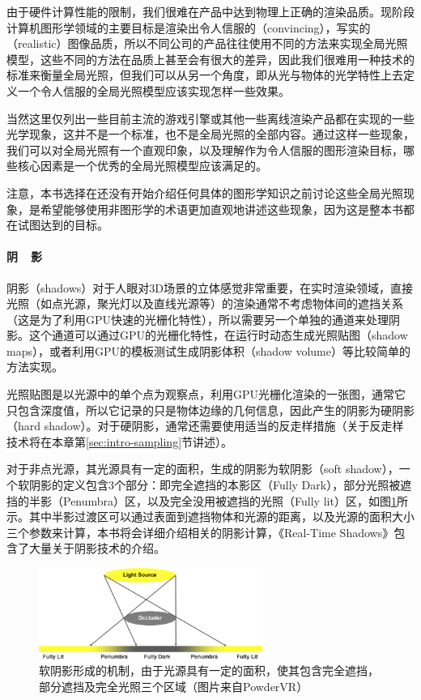 由于硬件计算性能的限制，我们很难在产品中达到物理上正确的渲染品质。现阶段计算机图形学领域的主要目标是渲染出令人信服的（convincing），写实的（realistic）图像品质，所以不同公司的产品往往使用不同的方法来实现全局光照模型，这些不同的方法在品质上甚至会有很大的差异，因此我们很难用一种技术的标准来衡量全局光照，但我们可以从另一个角度，即从光与物体的光学特性上去定义一个令人信服的全局光照模型应该实现怎样一些效果。

当然这里仅列出一些目前主流的游戏引擎或其他一些离线渲染产品都在实现的一些光学现象，这并不是一个标准，也不是全局光照的全部内容。通过这样一些现象，我们可以对全局光照有一个直观印象，以及理解作为令人信服的图形渲染目标，哪些核心因素是一个优秀的全局光照模型应该满足的。

注意，本书选择在还没有开始介绍任何具体的图形学知识之前讨论这些全局光照现象，是希望能够使用非图形学的术语更加直观地讲述这些现象，因为这是整本书都在试图达到的目标。



\paragraph{阴~~影}
阴影（shadows）对于人眼对3D场景的立体感觉非常重要，在实时渲染领域，直接光照（如点光源，聚光灯以及直线光源等）的渲染通常不考虑物体间的遮挡关系（这是为了利用GPU快速的光栅化特性），所以需要另一个单独的通道来处理阴影。这个通道可以通过GPU的光栅化特性，在运行时动态生成光照贴图（shadow maps），或者利用GPU的模板测试生成阴影体积（shadow volume）等比较简单的方法实现。

光照贴图是以光源中的单个点为观察点，利用GPU光栅化渲染的一张图，通常它只包含深度值，所以它记录的只是物体边缘的几何信息，因此产生的阴影为硬阴影（hard shadow）。对于硬阴影，通常还需要使用适当的反走样措施（关于反走样技术将在本章第\ref{sec:intro-sampling}节讲述）。

对于非点光源，其光源具有一定的面积，生成的阴影为软阴影（soft shadow），一个软阴影的定义包含3个部分：即完全遮挡的本影区（Fully Dark），部分光照被遮挡的半影（Penumbra）区，以及完全没用被遮挡的光照（Fully lit）区，如图\ref{f:intro-shadow}所示。其中半影过渡区可以通过表面到遮挡物体和光源的距离，以及光源的面积大小三个参数来计算，本书将会详细介绍相关的阴影计算，《Real-Time Shadows》\cite{b:rts}包含了大量关于阴影技术的介绍。

\begin{figure}
\sidecaption
	\includegraphics[width=0.65\textwidth]{figures/intro/shadow}
	\caption{软阴影形成的机制，由于光源具有一定的面积，使其包含完全遮挡，部分遮挡及完全光照三个区域（图片来自PowderVR）}
	\label{f:intro-shadow}
\end{figure}




